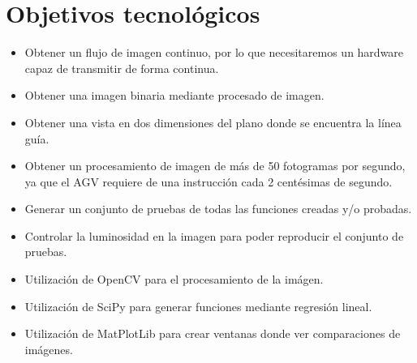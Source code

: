 \section{Objetivos tecnológicos}
\begin{itemize}
	\item Obtener un flujo de imagen continuo, por lo que necesitaremos un hardware capaz de transmitir  de forma continua.

	\item Obtener una imagen binaria mediante procesado de imagen.
	
	\item Obtener una vista en dos dimensiones del plano donde se encuentra la línea guía.
	
	\item Obtener un procesamiento de imagen de más de 50 fotogramas por segundo\cite{fps}, ya que el AGV requiere de una instrucción cada 2 centésimas de segundo.
	
	\item Generar un conjunto de pruebas de todas las funciones creadas y/o probadas.
	
	\item Controlar la luminosidad en la imagen para poder reproducir el conjunto de pruebas.
	
	\item Utilización de OpenCV para el procesamiento de la imágen.
	
	\item Utilización de SciPy para generar funciones mediante regresión lineal.
	
	\item Utilización de MatPlotLib para crear ventanas donde ver comparaciones de imágenes.
\end{itemize}
